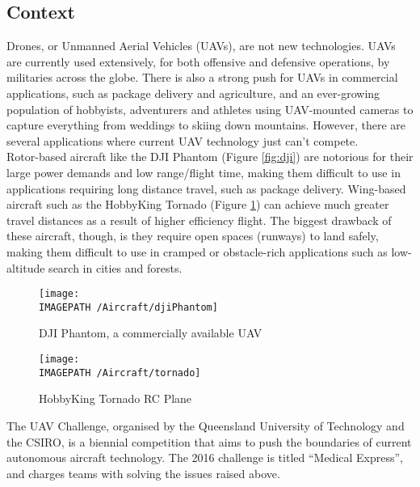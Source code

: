 \subsection{Context}
Drones, or Unmanned Aerial Vehicles (UAVs), are not new technologies. UAVs are currently used extensively, for both offensive\cite{ref:offence} and defensive\cite{ref:defence} operations, by militaries across the globe. There is also a strong push for UAVs in commercial applications, such as package delivery\cite{ref:package} and agriculture\cite{ref:agriculture}, and an ever-growing population of hobbyists\cite{ref:hobby}, adventurers\cite{ref:adventure} and athletes\cite{ref:sport} using UAV-mounted cameras to capture everything from weddings to skiing down mountains. However, there are several applications where current UAV technology just can't compete.\\

Rotor-based aircraft like the DJI Phantom (Figure \ref{fig:dji}) are notorious for their  large power demands and low range/flight time, making them difficult to use in applications requiring long distance travel, such as package delivery. Wing-based aircraft such as the HobbyKing Tornado\cite{ref:tornado} (Figure \ref{fig:tornado}) can achieve much greater travel distances as a result of higher efficiency flight. The biggest drawback of these aircraft, though, is they require open spaces (runways) to land safely, making them difficult to use in cramped or obstacle-rich applications such as low-altitude search in cities and forests.

\begin{figure}[!ht]
	\centering
	\begin{minipage}{.5\textwidth}
		\centering
		\texttt{[image: \\IMAGEPATH /Aircraft/djiPhantom]}
		\caption{DJI Phantom, a commercially available UAV}
		\label{fig:dji}
	\end{minipage}%
	\begin{minipage}{.5\textwidth}
		\centering
		\texttt{[image: \\IMAGEPATH /Aircraft/tornado]}
		\caption{HobbyKing Tornado RC Plane}
		\label{fig:tornado}
	\end{minipage}
\end{figure}
 
The UAV Challenge\cite{ref:challenge}, organised by the Queensland University of Technology and the CSIRO, is a biennial competition that aims to push the boundaries of current autonomous aircraft technology. The 2016 challenge is titled ``Medical Express'', and charges teams with solving the issues raised above.\\

